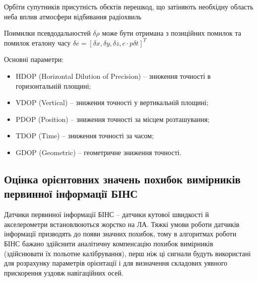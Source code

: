 Орбіти супутників
присутність обєктів перешкод, що затіняють необхідну область неба
вплив атмосфери
відбивання радіохвиль

Поимилки псевдодальностей $ \delta\rho $ може бути отримана з позиційних помилок 
 та помилок еталону часу $\delta e =[\delta x, \delta y, \delta z, c\cdot p\delta t]^T $
% 
% 



Основні параметри:
\begin{itemize}
 \item HDOP (Horizontal Dilution of Precision) -- зниження точності в горизонтальній площині;
 \item VDOP (Vertical) -- зниження точності у вертикальній площині;
 \item PDOP (Position) -- зниження точності за місцем розташування;
 \item TDOP (Time) -- зниження точності за часом;
 \item GDOP (Geometric) -- геометричне зниження точності.
\end{itemize}



\subsection{Оцінка орієнтовних значень похибок вимірників первинної інформації БІНС}

Датчики первинної інформації БІНС -- датчики кутової швидкості й акселерометри встановлюються жорстко на ЛА. 
Тяжкі умови роботи датчиків інформації призводять до появи значних похибок, тому в алгоритмах роботи БІНС бажано 
здійснити аналітичну компенсацію похибок вимірників (здійснювати їх польотне калібрування), перш ніж ці сигнали 
будуть використані для розрахунку параметрів орієнтації і для визначення складових уявного прискорення уздовж навігаційних осей.

